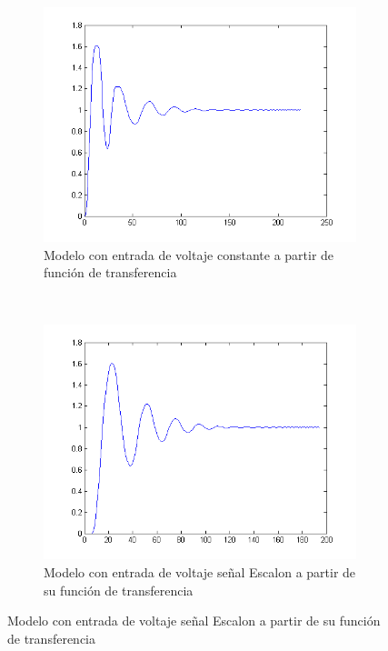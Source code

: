 \documentclass[]{article}
\begin{document}
\begin{figure}
	\centering
	\begin{subfigure}[b]{0.49\textwidth}
		\includegraphics[width=\textwidth]{modelo2Const.png}
		\caption{Modelo con entrada de voltaje constante a partir de función de transferencia}
		\label{fig:modelo2Const}
	\end{subfigure}
	~ %
	\begin{subfigure}[b]{0.49\textwidth}
		\includegraphics[width=\textwidth]{modelo2Escalon.png}
		\caption{Modelo con entrada de voltaje señal Escalon a partir de su función de transferencia}
		\label{fig:modelo2Escalon}
	\end{subfigure}

\end{figure}
\end{document}
